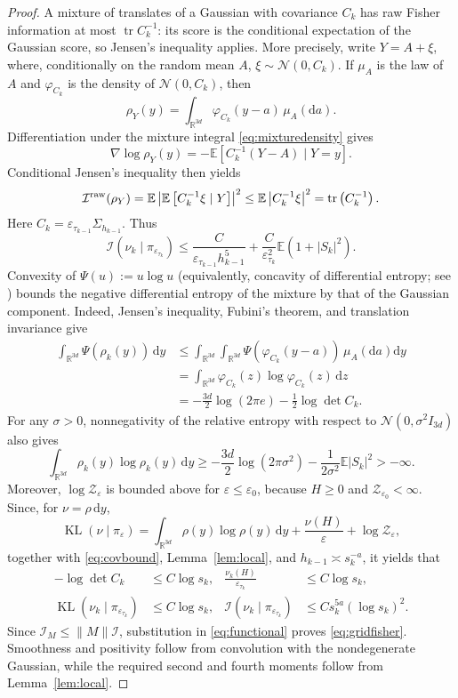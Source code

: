 \documentclass[11pt]{article}
\theoremstyle{definition}
\newcommand{\R}{\mathbb R}
\newcommand{\E}{\mathbb E}
\newcommand{\dd}{\mathrm d}
\newcommand{\KL}{\operatorname{KL}}
\newcommand{\Id}{I}
\newcommand{\cI}{\mathcal I}
\newcommand{\eps}{\varepsilon}
\begin{document}
\begin{proof}
A mixture of translates of a Gaussian with covariance $C_k$ has raw Fisher
information at most $\operatorname{tr}C_k^{-1}$: its score is the conditional
expectation of the Gaussian score, so Jensen's inequality applies.
More precisely, write $Y=A+\xi$, where, conditionally on the random mean $A$,
$\xi\sim\mathcal N(0,C_k)$. If $\mu_A$ is the law of $A$ and
$\varphi_{C_k}$ is the density of $\mathcal N(0,C_k)$, then
\begin{equation}\label{eq:mixturedensity}
 \rho_Y(y)=\int_{\R^{3d}}\varphi_{C_k}(y-a)\,\mu_A(\dd a).
\end{equation}
Differentiation under the mixture integral \eqref{eq:mixturedensity}
gives
\[
 \nabla\log\rho_Y(y)
 =-\E\left[C_k^{-1}(Y-A)\mid Y=y\right].
\]
Conditional Jensen's inequality then yields
\begin{align*}
 \cI^{\rm raw}(\rho_Y)
 =\E\left|\E\left[C_k^{-1}\xi\mid Y\right]\right|^2
 \leq\E\left|C_k^{-1}\xi\right|^2
 =\operatorname{tr}\left(C_k^{-1}\right).
\end{align*}
Here
$C_k=\eps_{\tau_{k-1}}\Sigma_{h_{k-1}}$. Thus
\[
 \cI\left(\nu_k\mid\pi_{\eps_{\tau_k}}\right)
 \leq \frac{C}{\eps_{\tau_{k-1}}h_{k-1}^5}
       +\frac{C}{\eps_{\tau_k}^2}\E\left(1+|S_k|^2\right).
\]
Convexity of $\Psi(u):=u\log u$ (equivalently, concavity of differential
entropy; see \cite[Section~8.6]{CoverThomas2006}) bounds the negative
differential entropy of the mixture by that of the Gaussian component.
Indeed, Jensen's inequality, Fubini's theorem, and translation invariance give
\begin{align*}
 \int_{\R^{3d}}\Psi(\rho_k(y))\,\dd y
 &\leq\int_{\R^{3d}}\int_{\R^{3d}}
       \Psi\!\left(\varphi_{C_k}(y-a)\right)\,\mu_A(\dd a)\dd y\\
 &=\int_{\R^{3d}}\varphi_{C_k}(z)\log\varphi_{C_k}(z)\,\dd z\\
 &=-\frac{3d}{2}\log(2\pi e)-\frac12\log\det C_k.
\end{align*}
For any $\sigma>0$, nonnegativity of the relative entropy with respect to
$\mathcal N(0,\sigma^2\Id_{3d})$ also gives
\[
 \int_{\R^{3d}}\rho_k(y)\log\rho_k(y)\,\dd y
 \geq-\frac{3d}{2}\log\left(2\pi\sigma^2\right)
      -\frac{1}{2\sigma^2}\E|S_k|^2> -\infty.
\]
Moreover, $\log\mathcal Z_\eps$ is bounded above for $\eps\leq\eps_0$, because
$H\geq0$ and $\mathcal Z_{\eps_0}<\infty$.
Since, for $\nu=\rho\,\dd y$,
\[
 \KL(\nu\mid\pi_\eps)
 =\int_{\R^{3d}}\rho(y)\log\rho(y)\,\dd y
  +\frac{\nu(H)}{\eps}+\log\mathcal Z_\eps,
\]
together with \eqref{eq:covbound}, Lemma~\ref{lem:local}, and
$h_{k-1}\asymp s_k^{-a}$, it yields that
\begin{align*}
 -\log\det C_k&\leq C\log s_k,
 &\frac{\nu_k(H)}{\eps_{\tau_k}}&\leq C\log s_k,\\
 \KL\left(\nu_k\mid\pi_{\eps_{\tau_k}}\right)&\leq C\log s_k,
 &\cI\left(\nu_k\mid\pi_{\eps_{\tau_k}}\right)
   &\leq Cs_k^{5a}(\log s_k)^2.
\end{align*}
Since $\cI_M\leq\|M\|\cI$, substitution in \eqref{eq:functional} proves
\eqref{eq:gridfisher}. Smoothness and positivity
follow from convolution with the nondegenerate Gaussian, while the required
second and fourth moments follow from Lemma~\ref{lem:local}.
\end{proof}
\end{document}
